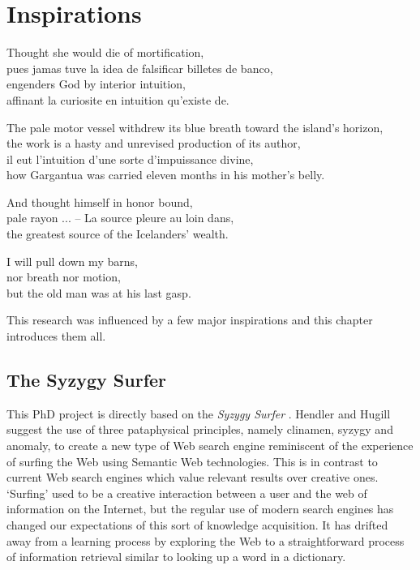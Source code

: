
\chapter{Inspirations}
\label{ch:inspirations}

\startcontents[chapters]

\vfill

Thought she would die of mortification, \\
pues jamas tuve la idea de falsificar billetes de banco, \\
engenders God by interior intuition, \\
affinant la curiosite en intuition qu'existe de.

The pale motor vessel withdrew its blue breath toward the island's horizon, \\
the work is a hasty and unrevised production of its author, \\
il eut l'intuition d'une sorte d'impuissance divine, \\
how Gargantua was carried eleven months in his mother's belly.

And thought himself in honor bound, \\
pale rayon ... -- La source pleure au loin dans, \\
the greatest source of the Icelanders' wealth.

I will pull down my barns, \\
nor breath nor motion, \\
but the old man was at his last gasp.

\newpage
\minicontents
\spirals

This research was influenced by a few major inspirations and this chapter introduces them all.


\section{The Syzygy Surfer}

This PhD project is directly based on the \textit{Syzygy Surfer} \autocite{Hendler2011, Hendler2013}. Hendler and Hugill suggest the use of three pataphysical principles, namely clinamen, syzygy and anomaly, to create a new type of Web search engine reminiscent of the experience of surfing the Web using Semantic Web technologies. This is in contrast to current Web search engines which value relevant results over creative ones.  `Surfing' used to be a creative interaction between a user and the web of information on the Internet, but the regular use of modern search engines has changed our expectations of this sort of knowledge acquisition. It has drifted away from a learning process by exploring the Web to a straightforward process of information retrieval similar to looking up a word in a dictionary.

